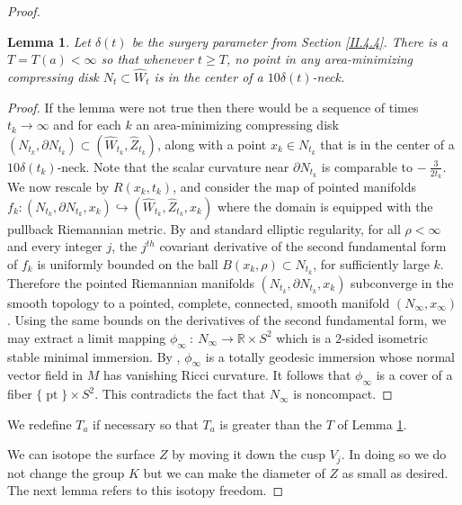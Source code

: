 \documentclass[12pt]{amsart}
\newcommand{\D}{\partial}
\newcommand{\pt}{\operatorname{pt}}
\newcommand{\R}{{\mathbb R}}
\newcommand{\de}{\delta}
\newcommand{\ra}{\rightarrow}
\numberwithin{equation}{section}
\theoremstyle{plain}
\newtheorem{lemma}[equation]{Lemma}
\theoremstyle{definition}
\theoremstyle{remark}
\begin{document}
\begin{proof}
\begin{lemma}
\label{lemavoids}
Let $\de(t)$ be the surgery parameter from 
Section \ref{II.4.4}. There is a $T = T(a) < \infty$ so that whenever $t \ge T$, 
no point in any area-minimizing compressing disk  $N_t\subset \hat W_t$ is in the
center of a $10 \delta(t)$-neck.
\end{lemma}
\begin{proof}
If the lemma were not true then
there would be a sequence of times $t_k\ra\infty$
and  for each $k$ an area-minimizing compressing disk $(N_{t_k},\D N_{t_k})
\subset (\hat W_{t_k},\hat Z_{t_k})$,
along with a point $x_k \in N_{t_k}$ that is in the center of a
$10 \delta(t_k)$-neck.
Note that the scalar curvature
near $\D N_{t_k}$ is comparable to $- \: \frac{3}{2t_k}$.
We now rescale by  $R(x_k, t_k)$, and consider the map of pointed
manifolds $f_k:(N_{t_k},\D N_{t_k},x_k)\hookrightarrow (\hat W_{t_k},\hat Z_{t_k},x_k)$ 
where the domain is equipped with the pullback Riemannian metric.
By \cite{schoen} and standard elliptic regularity, for all $\rho<\infty$
and every integer $j$, the $j^{th}$ covariant derivative of the 
second fundamental form of $f_k$ is uniformly bounded on the ball $B(x_k,\rho)\subset N_{t_k}$,
for sufficiently large $k$.  Therefore the pointed Riemannian 
manifolds $(N_{t_k},\D N_{t_k},x_k)$ 
subconverge in the smooth topology to a pointed, complete, connected, smooth manifold 
$(N_\infty,x_\infty)$.  Using the same bounds on the derivatives
of the second fundamental form, we may extract a limit mapping 
$\phi_{\infty} \: : \: N_{\infty} \ra \R \times S^2$ which 
is a $2$-sided  isometric stable minimal immersion.
By  \cite[Theorem 2]{schoenyau}, $\phi_{\infty}$ is a totally geodesic
immersion whose normal vector field in $M$ has vanishing Ricci curvature.
It follows that $\phi_{\infty}$ is a cover of
a fiber $\{ \pt \}\times S^2$.  This contradicts the fact that $N_\infty$ is noncompact.
\end{proof}

We redefine $T_a$ if necessary so that $T_a$ is greater than the $T$ of
Lemma \ref{lemavoids}.


We can isotope the surface $Z$ by moving it down the cusp $V_j$. In doing so
we do not change the group $K$
but we can make the diameter of $Z$ as small as desired. The next lemma
refers to this isotopy freedom.



\end{proof}
\end{document}
